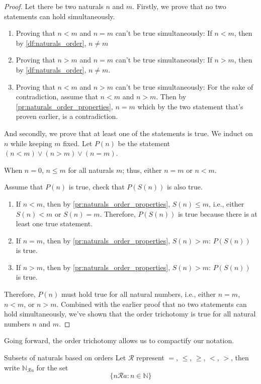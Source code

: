 \begin{proof}
  Let there be two naturals \(n\) and \(m\). Firstly, we prove that no two statements can hold
  simultaneously.
  \begin{enumerate}
    \item Proving that \(n < m\) and \(n = m\) can't be true simultaneously: If \(n < m\), then by
          \cref{df:naturals_order}, \(n \neq m\)
    \item Proving that \(n > m\) and \(n = m\) can't be true simultaneously: If \(n > m\), then by
          \cref{df:naturals_order}, \(n \neq m\).
    \item Proving that \(n < m\) and \(n > m\) can't be true simultaneously: For the sake of
          contradiction, assume that \(n < m\) and \(n > m\). Then by
          \cref{pr:naturals_order_properties}, \(n = m\) which by the two statement that's proven
          earlier, is a contradiction.
  \end{enumerate}
  And secondly, we prove that at least one of the statements is true. We induct on \(n\) while
  keeping \(m\) fixed. Let \(P(n)\) be the statement \((n < m) \lor (n > m) \lor (n = m)\).

  \basecase When \(n = 0\), \(n \leq m\) for all naturals \(m\); thus, either \(n = m\) or
  \(n < m\).

  \inductivestep Assume that \(P(n)\) is true, check that \(P(S(n))\) is also true.
  \begin{enumerate}
    \item If \(n < m\), then by \cref{pr:naturals_order_properties}, \(S(n) \leq m\), i.e., either
          \(S(n) < m\) or \(S(n) = m\). Therefore, \(P(S(n))\) is true because there is at least one
          true statement.
    \item If \(n = m\), then by \cref{pr:naturals_order_properties}, \(S(n) > m\): \(P(S(n))\) is
          true.
    \item If \(n > m\), then by \cref{pr:naturals_order_properties}, \(S(n) > m\): \(P(S(n))\) is
          true.
  \end{enumerate}
  Therefore, \(P(n)\) must hold true for all natural numbers, i.e., either \(n = m\), \(n < m\), or
  \(n > m\). Combined with the earlier proof that no two statements can hold simultaneously, we've
  shown that the order trichotomy is true for all natural numbers \(n\) and \(m\).
\end{proof}

Going forward, the order trichotomy allows us to compactify our notation.
\begin{notation}{Subsets of naturals based on orders}{}
  Let \(\mathrel{\mathcal{R}}\) represent \(=\), \(\leq\), \(\geq\), \(<\), \(>\),
  then write \(\mathbb{N}_{\mathrel{\mathcal{R}}a}\) for the set
  \begin{equation}
    \{n \mathrel{\mathcal{R}} a : n \in \mathbb{N}\}
  \end{equation}
\end{notation}

